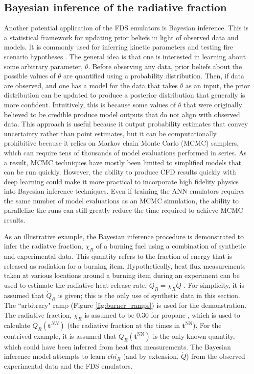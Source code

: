 \documentclass{article}
\begin{document}
\subsection{Bayesian inference of the radiative fraction}
Another potential application of the FDS emulators is Bayesian inference. This is a statistical framework for updating prior beliefs in light of observed data and models. It is commonly used for inferring kinetic parameters \cite{bruns2016inferring} and testing fire scenario hypotheses \cite{overholt2015quantitative}. The general idea is that one is interested in learning about some arbitrary parameter, $\theta$. Before observing any data, prior beliefs about the possible values of $\theta$ are quantified using a probability distribution. Then, if data are observed, and one has a model for the data that takes $\theta$ as an input, the prior distribution can be updated to produce a posterior distribution that generally is more confident. Intuitively, this is because some values of $\theta$ that were originally believed to be credible produce model outputs that do not align with observed data. This approach is useful because it output probability estimates that convey uncertainty rather than point estimates, but it can be computationally prohibitive because it relies on Markov chain Monte Carlo (MCMC) samplers, which can require tens of thousands of model evaluations performed in series. As a result, MCMC techniques have mostly been limited to simplified models that can be run quickly. However, the ability to produce CFD results quickly with deep learning could make it more practical to incorporate high fidelity physics into Bayesian inference techniques. Even if training the ANN emulators requires the same number of model evaluations as an MCMC simulation, the ability to parallelize the runs can still greatly reduce the time required to achieve MCMC results. 

As an illustrative example, the Bayesian inference procedure is demonstrated to infer the radiatve fraction, $\chi_R$ of a burning fuel using a combination of synthetic and experimental data. This quantity refers to the fraction of energy that is released as radiation for a burning item. Hypothetically, heat flux measurements taken at various locations around a burning item during an experiment can be used to estimate the radiative heat release rate, $\dot{Q}_R=\chi_R\dot{Q}$ \cite{koseki1989combustion}. For simplicity, it is assumed that $\dot{Q}_R$ is given; this is the only use of synthetic data in this section. The ``arbitrary" ramp (Figure \ref{fig:burner_ramps}) is used for the demonstration. The radiative fraction, $\chi_R$ is assumed to be 0.30 for propane \cite{beyler2016fire}, which is used to calculate $\dot{Q}_R(\boldsymbol{t}^{NN})$ (the radiative fraction at the times in $\boldsymbol{t}^\text{NN}$). For the contrived example, it is assumed that $\dot{Q}_R(\boldsymbol{t}^\text{NN})$ is the only known quantity, which could have been inferred from heat flux measurements. The Bayesian inference model attempts to learn $chi_R$ (and by extension, $\dot{Q}$) from the observed experimental data and the FDS emulators. 
\end{document}
